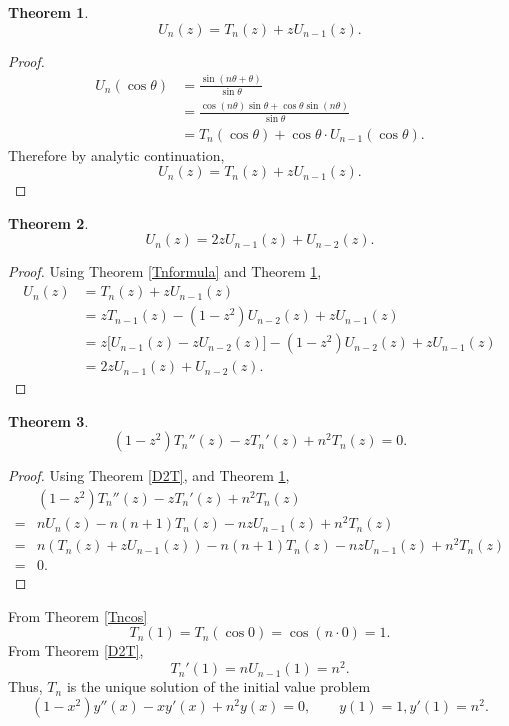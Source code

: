 \documentclass{article}
\theoremstyle{definition}
\newtheorem{theorem}{Theorem}
\theoremstyle{definition}
\begin{document}
\begin{theorem}
\[
U_n(z)=T_n(z)+zU_{n-1}(z).
\]
\label{Unformula}
\end{theorem}
\begin{proof}
\begin{align*}
U_n(\cos\theta)&=\frac{\sin (n\theta+\theta)}{\sin \theta}\\
&=\frac{\cos(n\theta)\sin\theta + \cos \theta \sin(n\theta)}{\sin \theta}\\
&=T_n(\cos \theta)+\cos \theta \cdot U_{n-1}(\cos \theta).
\end{align*}
Therefore by analytic continuation,
\[
U_n(z)=T_n(z)+zU_{n-1}(z).
\]
\end{proof}

\begin{theorem}
\[
U_n(z)=2zU_{n-1}(z)+U_{n-2}(z).
\]
\end{theorem}
\begin{proof}
Using Theorem \ref{Tnformula} and Theorem \ref{Unformula},
\begin{align*}
U_n(z) &= T_n(z)+zU_{n-1}(z)\\
&=zT_{n-1}(z) - (1-z^2)U_{n-2}(z)+zU_{n-1}(z)\\
&=z \bigg[U_{n-1}(z)-zU_{n-2}(z)\bigg] - (1-z^2)U_{n-2}(z) + zU_{n-1}(z)\\
&=2zU_{n-1}(z)+U_{n-2}(z).
\end{align*}
\end{proof}

\begin{theorem}
\[
(1-z^2)T_n''(z)-zT_n'(z)+n^2T_n(z)=0.
\]
\end{theorem}
\begin{proof}
Using Theorem \ref{D2T},
and Theorem \ref{Unformula},
\[
\begin{split}
&(1-z^2)T_n''(z)-zT_n'(z)+n^2T_n(z)\\
=&n U_n(z) - n(n+1)T_n(z)
-nzU_{n-1}(z)+n^2T_n(z)\\
=&n(T_n(z)+zU_{n-1}(z))-n(n+1)T_n(z)-nzU_{n-1}(z)+n^2T_n(z)\\
=&0.
\end{split}
\]
\end{proof}

From Theorem \ref{Tncos}
\[
T_n(1)=T_n(\cos 0) = \cos(n \cdot 0)=1.
\]
From Theorem \ref{D2T},
\[
T_n'(1) = nU_{n-1}(1) = n^2.
\]
Thus, $T_n$ is the unique solution of the initial value problem
\[
(1-x^2)y''(x)-xy'(x)+n^2y(x)=0,\qquad
y(1)=1,y'(1)=n^2.
\]
\end{document}
